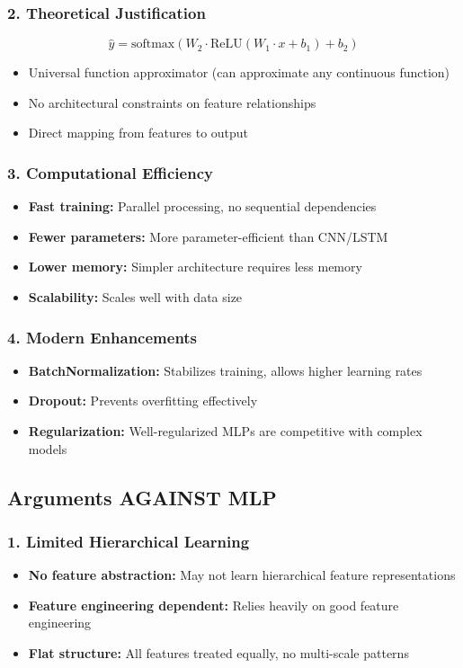 \documentclass[12pt]{article}
\begin{document}
\subsubsection{2. Theoretical Justification}
\[
\hat{y} = \text{softmax}(W_2 \cdot \text{ReLU}(W_1 \cdot x + b_1) + b_2)
\]
\begin{itemize}
    \item Universal function approximator (can approximate any continuous function)
    \item No architectural constraints on feature relationships
    \item Direct mapping from features to output
\end{itemize}

\subsubsection{3. Computational Efficiency}
\begin{itemize}
    \item \textbf{Fast training:} Parallel processing, no sequential dependencies
    \item \textbf{Fewer parameters:} More parameter-efficient than CNN/LSTM
    \item \textbf{Lower memory:} Simpler architecture requires less memory
    \item \textbf{Scalability:} Scales well with data size
\end{itemize}

\subsubsection{4. Modern Enhancements}
\begin{itemize}
    \item \textbf{BatchNormalization:} Stabilizes training, allows higher learning rates
    \item \textbf{Dropout:} Prevents overfitting effectively
    \item \textbf{Regularization:} Well-regularized MLPs are competitive with complex models
\end{itemize}

\subsection{Arguments AGAINST MLP}

\subsubsection{1. Limited Hierarchical Learning}
\begin{itemize}
    \item \textbf{No feature abstraction:} May not learn hierarchical feature representations
    \item \textbf{Feature engineering dependent:} Relies heavily on good feature engineering
    \item \textbf{Flat structure:} All features treated equally, no multi-scale patterns
\end{itemize}
\end{document}
